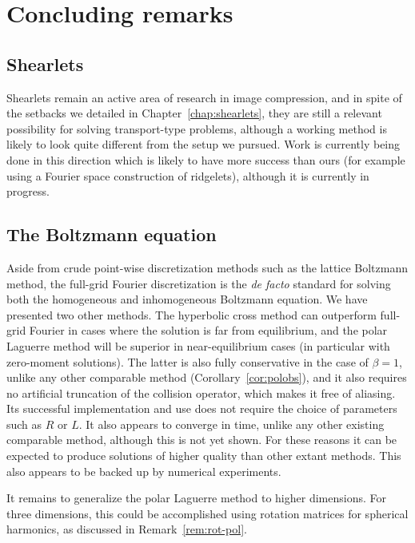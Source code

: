 \chapter{Concluding remarks}

\section{Shearlets}

Shearlets remain an active area of research in image compression, and in spite of the setbacks we detailed in
Chapter~\ref{chap:shearlets}, they are still a relevant possibility for solving transport-type problems,
although a working method is likely to look quite different from the setup we pursued.  Work is currently
being done in this direction which is likely to have more success than ours (for example \cite{Obermeier2013}
using a Fourier space construction of ridgelets), although it is currently in progress.

\section{The Boltzmann equation}

Aside from crude point-wise discretization methods such as the lattice Boltzmann method, the full-grid Fourier
discretization is the {\em de facto} standard for solving both the homogeneous and inhomogeneous Boltzmann
equation. We have presented two other methods. The hyperbolic cross method can outperform full-grid Fourier in
cases where the solution is far from equilibrium, and the polar Laguerre method will be superior in
near-equilibrium cases (in particular with zero-moment solutions). The latter is also fully conservative in
the case of $\beta=1$, unlike any other comparable method (Corollary~\ref{cor:polobs}), and it also requires
no artificial truncation of the collision operator, which makes it free of aliasing. Its successful
implementation and use does not require the choice of parameters such as $R$ or $L$. It also appears to
converge in time, unlike any other existing comparable method, although this is not yet shown. For these
reasons it can be expected to produce solutions of higher quality than other extant methods. This also appears
to be backed up by numerical experiments.

It remains to generalize the polar Laguerre method to higher dimensions. For three dimensions, this could be
accomplished using rotation matrices for spherical harmonics, as discussed in Remark~\ref{rem:rot-pol}.
